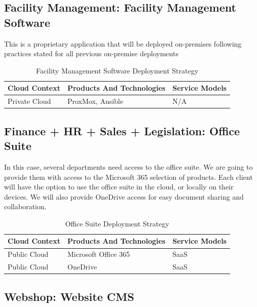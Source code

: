 \documentclass{llncs}
\begin{document}
\subsection{Facility Management: Facility Management Software}
This is a proprietary application that will be deployed on-premises following practices stated for all previous on-premise deployments\\
\begin{table}[h!]
    \centering
    \begin{tabular}{lll}
        \hline
        \textbf{Cloud Context} & \textbf{Products And Technologies} & \textbf{Service Models} \\
        \hline
        Private Cloud          & ProxMox, Ansible                   & N/A                     \\
        \hline
    \end{tabular}
    \caption{Facility Management Software Deployment Strategy}
\end{table}

\subsection{Finance + HR + Sales + Legislation: Office Suite}
In this case, several departments need access to the office suite. We are going to provide them with access to the Microsoft 365 selection of products.
Each client will have the option to use the office suite in the cloud, or locally on their devices. We will also provide OneDrive access for easy document sharing and collaboration.\\

\begin{table}[h!]
    \centering
    \begin{tabular}{lll}
        \hline
        \textbf{Cloud Context} & \textbf{Products And Technologies} & \textbf{Service Models} \\
        \hline
        Public Cloud           & Microsoft Office 365               & SaaS                    \\
        \hline
        Public Cloud           & OneDrive                           & SaaS                    \\
        \hline
    \end{tabular}
    \caption{Office Suite Deployment Strategy}
\end{table}

\subsection{Webshop: Website CMS}
\end{document}
